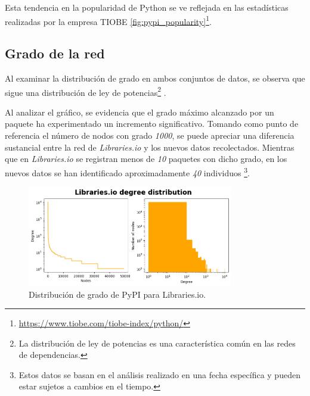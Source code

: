 Esta tendencia en la popularidad de Python se ve reflejada en las estadísticas realizadas por la
empresa TIOBE \ref{fig:pypi_popularity}\footnote{\url{https://www.tiobe.com/tiobe-index/python/}}.


\subsection{Grado de la red}

Al examinar la distribución de grado en ambos conjuntos de datos, se observa que sigue una distribución
de ley de potencias\footnote{La distribución de ley de potencias es una característica común en las redes
    de dependencias.} \cite{enwiki:1160892030}.

Al analizar el gráfico, se evidencia que el grado máximo alcanzado por un paquete ha
experimentado un incremento significativo. Tomando como punto de referencia el número de nodos con grado
\textit{1000}, se puede apreciar una diferencia sustancial entre la red de \textit{Libraries.io} y los
nuevos datos recolectados. Mientras que en \textit{Libraries.io} se registran menos de \textit{10} paquetes
con dicho grado, en los nuevos datos se han identificado aproximadamente \textit{40} individuos
\footnote{Estos datos se basan en el análisis realizado en una fecha específica y pueden estar sujetos
    a cambios en el tiempo.}.

\begin{figure}[ht!]
    \begin{center}
        \includegraphics[width=0.8\textwidth]{img/pypi/librariesio_degree_distribution.png}
        \caption{Distribución de grado de PyPI para Libraries.io.}
        \label{fig:pypi_librariesio_degree_distribution}
    \end{center}
\end{figure}

